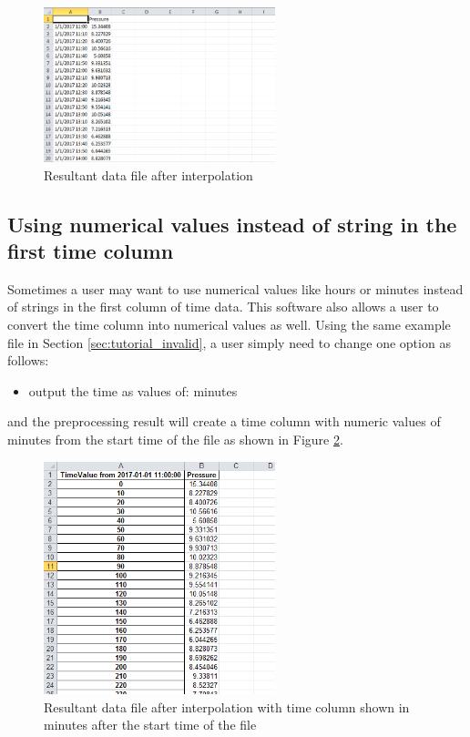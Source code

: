 \documentclass[12pt,a4paper]{article}
\begin{document}
\begin{figure}[H]
\centering
\includegraphics[width=0.6\textwidth]{missing_data_result.png}
\caption{Resultant data file after interpolation}
\label{fig:missing_data_result}
\end{figure}

\subsection{Using numerical values instead of string in the first time column}
Sometimes a user may want to use numerical values like hours or minutes instead of strings in the first column of time data.
This software also allows a user to convert the time column into numerical values as well.
Using the same example file in Section \ref{sec:tutorial_invalid}, a user simply need to change one option as follows:
\begin{itemize}
\item output the time as values of: minutes
\end{itemize}

and the preprocessing result will create a time column with numeric values of minutes from the start time of the file as shown in Figure \ref{fig:minute_data}.

\begin{figure}[H]
\centering
\includegraphics[width=0.6\textwidth]{missing_data_result_minute.png}
\caption{Resultant data file after interpolation with time column shown in minutes after the start time of the file}
\label{fig:minute_data}
\end{figure}
\end{document}

